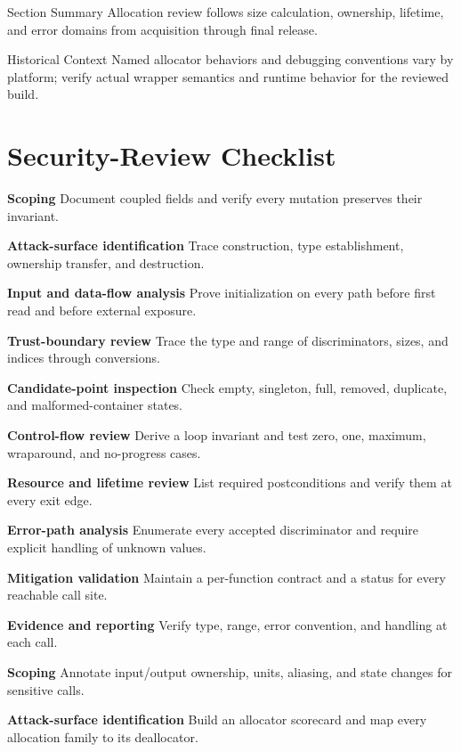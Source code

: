 \documentclass[11pt,letterpaper]{article}
\begin{document}
\begin{CornellSummaryBox}{Section Summary}
Allocation review follows size calculation, ownership, lifetime, and error domains from acquisition through final release.
\end{CornellSummaryBox}
\begin{CornellLegacyBox}{Historical Context}
Named allocator behaviors and debugging conventions vary by platform; verify actual wrapper semantics and runtime behavior for the reviewed build.
\end{CornellLegacyBox}
\section{Security-Review Checklist}
\begin{CornellChecklist}
\item \textbf{Scoping}
Document coupled fields and verify every mutation preserves their invariant.
\item \textbf{Attack-surface identification}
Trace construction, type establishment, ownership transfer, and destruction.
\item \textbf{Input and data-flow analysis}
Prove initialization on every path before first read and before external exposure.
\item \textbf{Trust-boundary review}
Trace the type and range of discriminators, sizes, and indices through conversions.
\item \textbf{Candidate-point inspection}
Check empty, singleton, full, removed, duplicate, and malformed-container states.
\item \textbf{Control-flow review}
Derive a loop invariant and test zero, one, maximum, wraparound, and no-progress cases.
\item \textbf{Resource and lifetime review}
List required postconditions and verify them at every exit edge.
\item \textbf{Error-path analysis}
Enumerate every accepted discriminator and require explicit handling of unknown values.
\item \textbf{Mitigation validation}
Maintain a per-function contract and a status for every reachable call site.
\item \textbf{Evidence and reporting}
Verify type, range, error convention, and handling at each call.
\item \textbf{Scoping}
Annotate input/output ownership, units, aliasing, and state changes for sensitive calls.
\item \textbf{Attack-surface identification}
Build an allocator scorecard and map every allocation family to its deallocator.
\end{CornellChecklist}
\end{document}
